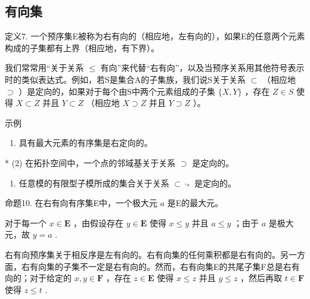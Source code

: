 \subsection{有向集}

定义7. 一个预序集E被称为右有向的（相应地，左有向的），如果E的任意两个元素构成的子集都有上界（相应地，有下界）。

我们常常用“关于关系 \(\leqslant\) 有向”来代替“右有向”，以及当预序关系用其他符号表示时的类似表达式。例如，若S是集合A的子集族，我们说S关于关系 \(\subset\) （相应地 \(\supset\) ）是定向的，如果对于每个由S中两个元素组成的子集 \(\{X, Y\}\) ，存在 \(Z \in S\) 使得 \(X \subset Z\) 并且 \(Y \subset Z\) （相应地 \(X \supset Z\) 并且 \(Y \supset Z\) ）。

示例

\begin{enumerate}
\def\labelenumi{(\arabic{enumi})}
\tightlist
\item
  具有最大元素的有序集是右定向的。
\end{enumerate}

* (2) 在拓扑空间中，一个点的邻域基关于关系 \(\supset\) 是定向的。

\begin{enumerate}
\def\labelenumi{(\arabic{enumi})}
\setcounter{enumi}{2}
\tightlist
\item
  任意模的有限型子模所成的集合关于关系 \(\subset\cdot_{*}\) 是定向的。
\end{enumerate}

命题10. 在右有向有序集E中，一个极大元 \(a\) 是E的最大元。

对于每一个 \(x \in \mathbf{E}\) ，由假设存在 \(y \in \mathbf{E}\) 使得 \(x \leqslant y\) 并且 \(a \leqslant y\) ；由于 \(a\) 是极大元，故 \(y = a\) .

右有向预序集关于相反序是左有向的。右有向集的任何乘积都是右有向的。另一方面，右有向集的子集不一定是右有向的。然而，右有向集E的共尾子集F总是右有向的；对于给定的 \(x, y \in \mathbf{F}\) ，存在 \(z \in \mathbf{E}\) 使得 \(x \leqslant z\) 并且 \(y \leqslant z\) ，然后再取 \(t \in \mathbf{F}\) 使得 \(z \leqslant t\) .

